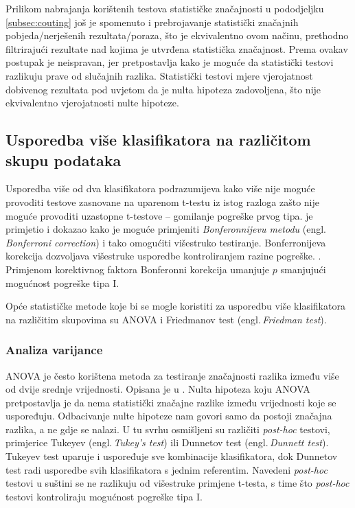 Prilikom nabrajanja korištenih testova statističke značajnosti u pododjeljku \ref{subsec:couting} još je spomenuto i prebrojavanje statistički značajnih pobjeda/nerješenih rezultata/poraza, što je ekvivalentno ovom načinu, prethodno filtrirajući rezultate nad kojima je utvrđena statistička značajnost. Prema \citep{demvsar2006statistical} ovakav postupak je neispravan, jer pretpostavlja kako je moguće da statistički testovi razlikuju prave od slučajnih razlika. Statistički testovi mjere vjerojatnost dobivenog rezultata pod uvjetom da je nulta hipoteza zadovoljena, što nije ekvivalentno vjerojatnosti nulte hipoteze.

\subsection{Usporedba više klasifikatora na različitom skupu podataka}

Usporedba više od dva klasifikatora podrazumijeva kako više nije moguće provoditi testove zasnovane na uparenom t-testu iz istog razloga zašto nije moguće provoditi uzastopne t-testove -- gomilanje pogreške prvog tipa. \citep{salzberg1997comparing} je primjetio i dokazao kako je moguće primjeniti \textit{Bonferonnijevu metodu} (engl.\,\textit{Bonferroni correction}) i tako omogućiti višestruko testiranje. Bonferronijeva korekcija dozvoljava višestruke usporedbe kontroliranjem razine pogreške. \citep{bland1995multiple}. Primjenom korektivnog faktora Bonferonni korekcija umanjuje $p$ smanjujući mogućnost pogreške tipa I.

Opće statističke metode koje bi se mogle koristiti za usporedbu više klasifikatora na različitim skupovima su ANOVA i Friedmanov test (engl.\,\textit{Friedman test}). 

\subsubsection{Analiza varijance}


ANOVA je često korištena metoda za testiranje značajnosti razlika između više od dvije srednje vrijednosti. Opisana je u \citep{fisher1956statistical}. Nulta hipoteza koju ANOVA pretpostavlja je da nema statistički značajne razlike između vrijednosti koje se uspoređuju. Odbacivanje nulte hipoteze nam govori samo da postoji značajna razlika, a ne gdje se nalazi. U tu svrhu osmišljeni su različiti \textit{post-hoc} testovi, primjerice Tukeyev (engl.\,\textit{Tukey's test}) ili Dunnetov test (engl.\,\textit{Dunnett test})\citep{wallenstein1980some}. Tukeyev test uparuje i uspoređuje sve kombinacije klasifikatora, dok Dunnetov test radi usporedbe svih klasifikatora s jednim referentim. Navedeni \textit{post-hoc} testovi u suštini se ne razlikuju od višestruke primjene t-testa,  s time što \textit{post-hoc} testovi kontroliraju mogućnost pogreške tipa I.

